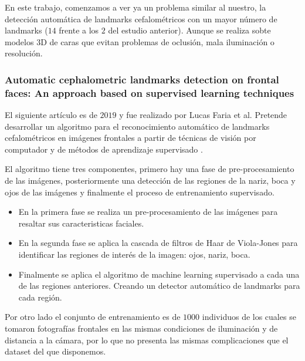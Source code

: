                 \medskip

                \noindent En este trabajo, comenzamos a ver ya un problema similar al nuestro, la detección automática de landmarks cefalométricos con un mayor número de landmarks ($14$ frente a los $2$ del estudio anterior). Aunque se realiza sobte modelos $3$D de caras que evitan problemas de oclusión, mala iluminación o resolución.

            \subsubsection{Automatic cephalometric landmarks detection on frontal faces: An approach based on supervised learning techniques}

                \noindent El siguiente artículo es de $2019$ y fue realizado por Lucas Faria et al. Pretende desarrollar un algoritmo para el reconocimiento automático de landmarks cefalométricos en imágenes frontales a partir de técnicas de visión por computador y de métodos de aprendizaje supervisado \cite{porto2019automatic}.

                \medskip

                \noindent El algoritmo tiene tres componentes, primero hay una fase de pre-procesamiento de las imágenes, posteriormente una detección de las regiones de la nariz, boca y ojos de las imágenes y finalmente el proceso de entrenamiento supervisado.

                \begin{itemize}
                    \item En la primera fase se realiza un pre-procesamiento de las imágenes para resaltar sus caracteristicas faciales. 
                    \item En la segunda fase se aplica la cascada de filtros de Haar de Viola-Jones para identificar las regiones de interés de la imagen: ojos, nariz, boca.
                    \item Finalmente se aplica el algoritmo de machine learning supervisado a cada una de las regiones anteriores. Creando un detector automático de landmarks para cada región.
                \end{itemize}

                \medskip

                \noindent Por otro lado el conjunto de entrenamiento es de $1000$ individuos de los cuales se tomaron fotografías frontales en las mismas condiciones de iluminación y de distancia a la cámara, por lo que no presenta las mismas complicaciones que el dataset del que disponemos. 


